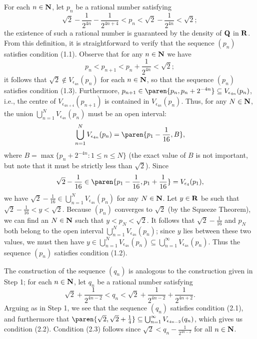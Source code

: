 \documentclass{lew98_solutions}
\begin{document}
\begin{solution}
\begin{enumerate}
        \noindent \hrulefill


        \noindent For each \( n \in \mathbf{N} \), let \( p_n \) be a rational number satisfying
        \[
            \sqrt{2} - \frac{1}{2^{4n}} - \frac{1}{2^{4n + 4}} < p_n < \sqrt{2} - \frac{1}{2^{4n}} < \sqrt{2};
        \]
        the existence of such a rational number is guaranteed by the density of \( \mathbf{Q} \) in \( \mathbf{R} \). From this definition, it is straightforward to verify that the sequence \( (p_n) \) satisfies condition (1.1). Observe that for any \( n \in \mathbf{N} \) we have
        \[
            p_n < p_{n+1} < p_n + \frac{1}{2^{4n}} < \sqrt{2};
        \]
        it follows that \( \sqrt{2} \not\in V_{\epsilon_{4n}}(p_n) \) for each \( n \in \mathbf{N} \), so that the sequence \( (p_n) \) satisfies condition (1.3). Furthermore, \( p_{n+1} \in \paren{ p_n, p_n + 2^{-4n} } \subseteq V_{\epsilon_{4n}}(p_n) \), i.e., the centre of \( V_{\epsilon_{4n+4}}(p_{n+1}) \) is contained in \( V_{\epsilon_{4n}}(p_n) \). Thus, for any \( N \in \mathbf{N} \), the union \( \bigcup_{n=1}^N V_{\epsilon_{4n}}(p_n) \) must be an open interval:
        \[
            \bigcup_{n=1}^N V_{\epsilon_{4n}}(p_n) = \paren{ p_1 - \frac{1}{16}, B },
        \]
        where \( B = \max \{ p_n + 2^{-4n} : 1 \leq n \leq N \} \) (the exact value of \( B \) is not important, but note that it must be strictly less than \( \sqrt{2} \)). Since
        \[
            \sqrt{2} - \frac{1}{16} \in \paren{ p_1 - \frac{1}{16}, p_1 + \frac{1}{16} } = V_{\epsilon_4}(p_1),
        \]
        we have \( \sqrt{2} - \tfrac{1}{16} \in \bigcup_{n=1}^N V_{\epsilon_{4n}}(p_n) \) for any \( N \in \mathbf{N} \). Let \( y \in \mathbf{R} \) be such that \( \sqrt{2} - \tfrac{1}{16} < y < \sqrt{2} \). Because \( (p_n) \) converges to \( \sqrt{2} \) (by the Squeeze Theorem), we can find an \( N \in \mathbf{N} \) such that \( y < p_N < \sqrt{2} \). It follows that \( \sqrt{2} - \tfrac{1}{16} \) and \( p_N \) both belong to the open interval \( \bigcup_{n=1}^N V_{\epsilon_{4n}}(p_n) \); since \( y \) lies between these two values, we must then have \( y \in \bigcup_{n=1}^N V_{\epsilon_{4n}}(p_n) \subseteq \bigcup_{n=1}^{\infty} V_{\epsilon_{4n}}(p_n) \). Thus the sequence \( (p_n) \) satisfies condition (1.2).

        \noindent \hrulefill


        \noindent The construction of the sequence \( (q_n) \) is analogous to the construction given in Step 1; for each \( n \in \mathbf{N} \), let \( q_n \) be a rational number satisfying
        \[
            \sqrt{2} + \frac{1}{2^{4n - 2}} < q_n <  \sqrt{2} + \frac{1}{2^{4n - 2}} + \frac{1}{2^{4n + 2}}.
        \]
        Arguing as in Step 1, we see that the sequence \( (q_n) \) satisfies condition (2.1), and furthermore that \( \paren{ \sqrt{2}, \sqrt{2} + \tfrac{1}{4} } \subseteq \bigcup_{n=1}^{\infty} V_{\epsilon_{4n-2}}(q_n) \), which gives us condition (2.2). Condition (2.3) follows since \( \sqrt{2} < q_n - \tfrac{1}{2^{4n - 2}} \) for all \( n \in \mathbf{N} \).


\end{enumerate}
\end{solution}
\end{document}
